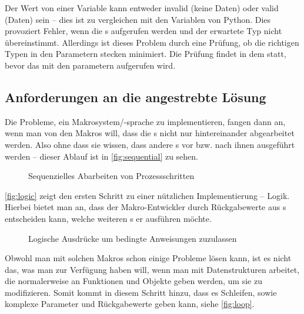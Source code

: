       Der Wert von einer  Variable kann entweder invalid (keine Daten) oder valid (Daten) sein -- dies ist zu vergleichen mit den Variablen von Python. Dies provoziert Fehler, wenn die s aufgerufen werden und der erwartete Typ nicht übereinstimmt. Allerdings ist dieses Problem durch eine Prüfung, ob die richtigen Typen in den  Parametern stecken minimiert. Die Prüfung findet in dem  statt, bevor das  mit den parametern aufgerufen wird.

  \subsection{Anforderungen an die angestrebte Lösung}
  \label{ssec:Anforderungen an die angestrebte Lösung}
    Die Probleme, ein Makrosystem/-sprache zu implementieren, fangen dann an, wenn man von den Makros will, dass die s nicht nur hintereinander abgearbeitet werden. Also ohne dass sie wissen, dass andere s vor bzw. nach ihnen ausgeführt werden -- dieser Ablauf ist in \autoref{fig:sequential} zu sehen.

    \begin{figure}[H]
      \centering
      \caption{Sequenzielles Abarbeiten von Prozessschritten}
      \label{fig:sequential}
    \end{figure}

    \autoref{fig:logic} zeigt den ersten Schritt zu einer nützlichen Implementierung -- Logik. Hierbei bietet man an, dass der Makro-Entwickler durch Rückgabewerte aus s entscheiden kann, welche weiteren s er ausführen möchte.

    \begin{figure}[H]
      \centering
      \caption{Logische Ausdrücke um bedingte Anweisungen zuzulassen}
      \label{fig:logic}
    \end{figure}

    Obwohl man mit solchen Makros schon einige Probleme lösen kann, ist es nicht das, was man zur Verfügung haben will, wenn man mit Datenstrukturen arbeitet, die normalerweise an Funktionen und Objekte geben werden, um sie zu modifizieren. Somit kommt in diesem Schritt hinzu, dass es Schleifen, sowie komplexe Parameter und Rückgabewerte geben kann, siehe \autoref{fig:loop}.

